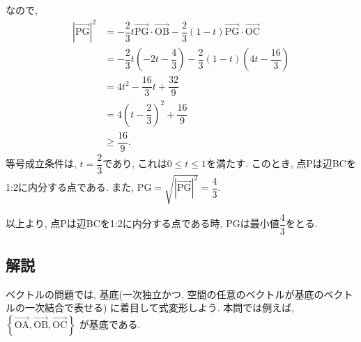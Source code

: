 \documentclass[dvipdfmx,a4paper]{jsarticle}
\newcommand{\oraw}{\overrightarrow}
\newcommand{\2}{I\hspace{-1pt}I}
\newcommand{\3}{I\hspace{-1pt}I\hspace{-1pt}I}
\begin{document}
\begin{itemize}
        なので, 
        \begin{align*}
            |\oraw{\mathrm{PG}}|^2 
            &= - \dfrac{2}{3}t \oraw{\mathrm{PG}} \cdot \oraw{\mathrm{OB}} - \dfrac{2}{3} (1-t) \oraw{\mathrm{PG}} \cdot \oraw{\mathrm{OC}} \\
            &= - \dfrac{2}{3}t \left(-2t - \dfrac{4}{3}\right) - \dfrac{2}{3} (1-t) \left(4t - \dfrac{16}{3}\right) \\
            &= 4t^2 - \dfrac{16}{3}t + \dfrac{32}{9} \\
            &= 4 \left(t- \dfrac{2}{3}\right)^2 + \dfrac{16}{9} \\
            &\geq \dfrac{16}{9}. 
        \end{align*}
        等号成立条件は, $t=\dfrac{2}{3}$であり, これは$0\leq t\leq 1$を満たす. 
        このとき, 点Pは辺BCを1:2に内分する点である. また, $\mathrm{PG} = \sqrt{|\oraw{\mathrm{PG}}|^2 } = \dfrac{4}{3}$. 

        以上より, 点Pは辺BCを1:2に内分する点である時, PGは最小値$\dfrac{4}{3}$をとる. 

    \end{itemize}
    


    

    \subsection{解説}
    ベクトルの問題では, 基底(一次独立かつ, 空間の任意のベクトルが基底のベクトルの一次結合で表せる)
    に着目して式変形しよう. 本問では例えば, $\left\{\oraw{\mathrm{OA}}, \oraw{\mathrm{OB}}, \oraw{\mathrm{OC}}\right\}$
    が基底である. 
    
\end{document}
